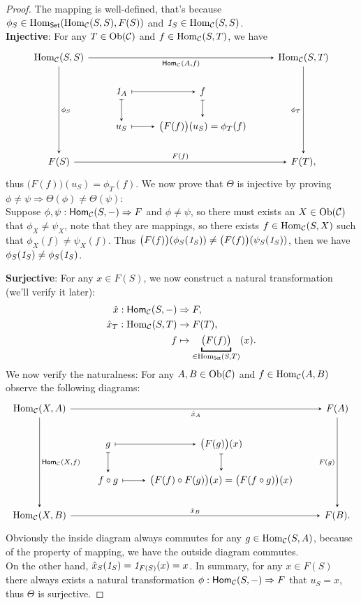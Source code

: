 \documentclass{article}
\begin{document}
\begin{proof}
	The mapping is well-defined, that's because $\phi_S\in\mathrm{Hom}_\mathsf{Set}(\mathrm{Hom}_{\mathcal{C}}(S,S),F(S))$ and $\mathit{1}_S\in \mathrm{Hom}_{\mathcal{C}}(S,S)$.\\
	
	\textbf{Injective}: For any $T\in\mathrm{Ob}(\mathcal{C})$ and $f\in\mathrm{Hom}_{\mathcal{C}}(S,T)$, we have
	\[\begin{tikzcd}
		{\Hom_\ca(S,S)} \arrow[->,>=stealth, rrr, "{\mathsf{Hom}_\ca(A,f)}"'] \arrow[->,>=stealth, ddd, "\phi_S"] & & & {\Hom_\ca(S,T)} \arrow[->,>=stealth, ddd, "\phi_T"']\\ &
		\1_A \arrow[->,>=stealth, r, maps to] \arrow[->,>=stealth, d, maps to] & f \arrow[->,>=stealth, d, maps to] & \\ &
		u_S \arrow[->,>=stealth, r, maps to] & \big(F(f)\big)(u_S)=\phi_T(f) & \\
		F(S) \arrow[->,>=stealth, rrr, "F(f)"] & & & F(T),
	\end{tikzcd}\]
	thus $\big(F(f)\big)(u_S)=\phi_T(f)$. We now prove that $\Theta$ is injective by proving $\phi\ne\psi\Longrightarrow\Theta(\phi)\ne\Theta(\psi)$:\\
	Suppose $\phi,\psi:\mathsf{Hom}_{\mathcal{C}}(S,-)\Rightarrow F$ and $\phi\ne\psi$, so there must exists an $X\in\mathrm{Ob}(\mathcal{C})$ that $\phi_X\ne\psi_X$, note that they are mappings, so there exists $f\in\mathrm{Hom}_{\mathcal{C}}(S,X)$ such that $\phi_X(f)\ne\psi_X(f)$. Thus $\big(F(f)\big)(\phi_S(\mathit{1}_S))\ne\big(F(f)\big)(\psi_S(\mathit{1}_S))$, then we have $\phi_S(\mathit{1}_S)\ne\phi_S(\mathit{1}_S)$.
	
	\textbf{Surjective}: For any $x\in F(S)$, we now construct a natural transformation (we'll verify it later):
	\begin{align*}
		\hat x:\mathsf{Hom}_\ca(S,-) & \Rightarrow F,\\
		\hat x_T:\Hom_\ca(S,T) & \to F(T),\\
		f & \mapsto\underbracket{\big(F(f)\big)}_{\in\Hom_\mathsf{Set}(S,T)}(x).
	\end{align*}
	We now verify the naturalness: For any $A,B\in\mathrm{Ob}(\mathcal{C})$ and $f\in\mathrm{Hom}_{\mathcal{C}}(A,B)$ observe the following diagrams:
	\[\begin{tikzcd}
		{\Hom_\ca(X,A)} \arrow[->,>=stealth, rrr, "\hat x_A"'] \arrow[->,>=stealth, ddd, "{\mathsf{Hom}_\ca(X,f)}"] & & & F(A) \arrow[->,>=stealth, ddd, "F(g)"']\\
		& g \arrow[->,>=stealth, r, maps to] \arrow[->,>=stealth, d, maps to] & \big(F(g)\big)(x) \arrow[->,>=stealth, d, maps to] & \\
		& f\circ g \arrow[->,>=stealth, r, maps to] & \big(F(f)\circ F(g)\big)(x)=\big(F(f\circ g)\big)(x) & \\
		{\Hom_\ca(X,B)} \arrow[->,>=stealth, rrr, "\hat x_B"] & & & F(B).
	\end{tikzcd}\]
	Obviously the inside diagram always commutes for any $g\in\mathrm{Hom}_{\mathcal{C}}(S,A)$, because of the property of mapping, we have the outside diagram commutes.\\
	On the other hand, $\hat x_S(\mathit{1}_S)=\mathit{1}_{F(S)}(x)=x$. In summary, for any $x\in F(S)$ there always exists a natural transformation $\phi:\mathsf{Hom}_{\mathcal{C}}(S,-)\Rightarrow F$ that $u_S=x$, thus $\Theta$ is surjective.
	

\end{proof}
\end{document}

